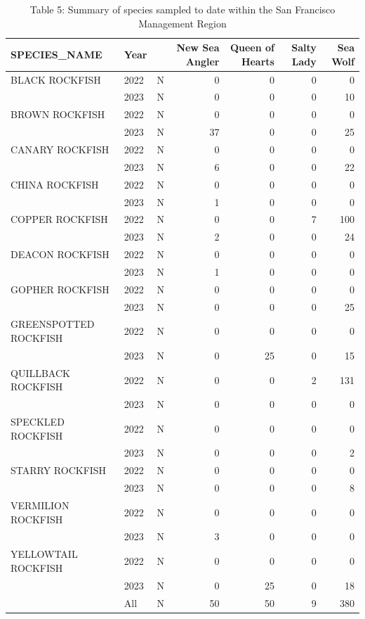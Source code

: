 \documentclass[
  letterpaper,
  DIV=11,
  numbers=noendperiod]{scrartcl}
\begin{document}
\begin{table}

\caption{Table 5: Summary of species sampled to date within the San Francisco Management Region}
\centering
\begin{tabular}[t]{lllrrrr}
\toprule
SPECIES\_NAME & Year &   & New Sea Angler & Queen of Hearts & Salty Lady & Sea Wolf\\
\midrule
BLACK ROCKFISH & 2022 & N & 0 & 0 & 0 & 0\\
 & 2023 & N & 0 & 0 & 0 & 10\\
BROWN ROCKFISH & 2022 & N & 0 & 0 & 0 & 0\\
 & 2023 & N & 37 & 0 & 0 & 25\\
CANARY ROCKFISH & 2022 & N & 0 & 0 & 0 & 0\\
 & 2023 & N & 6 & 0 & 0 & 22\\
CHINA ROCKFISH & 2022 & N & 0 & 0 & 0 & 0\\
 & 2023 & N & 1 & 0 & 0 & 0\\
COPPER ROCKFISH & 2022 & N & 0 & 0 & 7 & 100\\
 & 2023 & N & 2 & 0 & 0 & 24\\
DEACON ROCKFISH & 2022 & N & 0 & 0 & 0 & 0\\
 & 2023 & N & 1 & 0 & 0 & 0\\
GOPHER ROCKFISH & 2022 & N & 0 & 0 & 0 & 0\\
 & 2023 & N & 0 & 0 & 0 & 25\\
GREENSPOTTED ROCKFISH & 2022 & N & 0 & 0 & 0 & 0\\
 & 2023 & N & 0 & 25 & 0 & 15\\
QUILLBACK ROCKFISH & 2022 & N & 0 & 0 & 2 & 131\\
 & 2023 & N & 0 & 0 & 0 & 0\\
SPECKLED ROCKFISH & 2022 & N & 0 & 0 & 0 & 0\\
 & 2023 & N & 0 & 0 & 0 & 2\\
STARRY ROCKFISH & 2022 & N & 0 & 0 & 0 & 0\\
 & 2023 & N & 0 & 0 & 0 & 8\\
VERMILION ROCKFISH & 2022 & N & 0 & 0 & 0 & 0\\
 & 2023 & N & 3 & 0 & 0 & 0\\
YELLOWTAIL ROCKFISH & 2022 & N & 0 & 0 & 0 & 0\\
 & 2023 & N & 0 & 25 & 0 & 18\\
 & All & N & 50 & 50 & 9 & 380\\
\bottomrule
\end{tabular}
\end{table}
\end{document}
